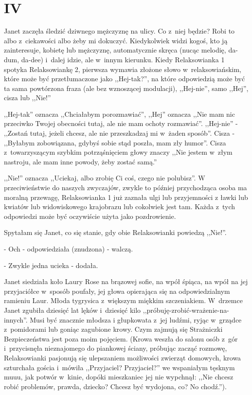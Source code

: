 \documentclass[oneside,polish,12pt,sfheadings]{mwbk}
\begin{document}
\chapter{IV}

Janet zaczęła śledzić dziwnego mężczyznę na ulicy. Co z~niej będzie?
Robi to albo z~ciekawości albo żeby mi dokuczyć. Kiedykolwiek widzi
kogoś, kto ją zainteresuje, kobietę lub mężczyznę, automatycznie skręca
(nucąc melodię, da-dum, da-dee) i~dalej idzie, ale w~innym kierunku.
Kiedy Relaksowianka 1 spotyka Relaksowiankę 2, pierwsza wymawia złożone
słowo w~relaksowiańskim, które może być przetłumaczone jako ,,Hej-tak?'',
na które odpowiedzią może być ta sama powtórzona fraza (ale bez wznoszącej
modulacji), ,,Hej-nie'', samo ,,Hej'', cisza lub ,,Nie!''

,,Hej-tak'' oznacza ,,Chciałabym porozmawiać'', ,,Hej'' oznacza ,,Nie
mam nic przeciwko Twojej obecności tutaj, ale nie mam ochoty rozmawiać''.
,,Hej-nie'' - ,,Zostań tutaj, jeżeli chcesz, ale nie przeszkadzaj
mi w~żaden sposób''. Cisza - ,,Byłabym zobowiązana, gdybyś sobie stąd
poszła, mam zły humor''. Cisza z~towarzyszącym szybkim potrząśnięciem
głowy znaczy ,,Nie jestem w~złym nastroju, ale mam inne powody, żeby
zostać samą.''

,,Nie!'' oznacza ,,Uciekaj, albo zrobię Ci coś, czego nie polubisz''.
W przeciwieństwie do naszych zwyczajów, zwykle to później przychodząca
osoba ma moralną przewagę, Relaksowianka 1 już zaznała ulgi lub przyjemności
z ławki lub kwiatów lub widowiskowego krajobrazu lub cokolwiek jest
tam. Każda z~tych odpowiedzi może być oczywiście użyta jako pozdrowienie.

Spytałam się Janet, co się stanie, gdy obie Relaksowianki powiedzą
,,Nie!''.

- Och - odpowiedziała (znudzona) - walczą.

- Zwykle jedna ucieka - dodała.

Janet siedziała koło Laury Rose na brązowej sofie, na wpół śpiąca,
na wpół na jej przyjaciółce w~sposób poufały, jej głowa opierająca
się na odpowiedzialnym ramieniu Laur. Młoda tygrysica z~większym miękkim
szczeniakiem. W~drzemce Janet zgubiła dziesięć lat lęków i~dziesięć
kilo ,,próbuję-zrobić-wrażenie-na-innych''. Musi być znacznie młodsza
i głupkowata z~jej ludźmi, ryjąc w~grządce z~pomidorami lub goniąc
zagubione krowy. Czym zajmują się Strażniczki Bezpieczeństwa jest
poza moim pojęciem. (Krowa weszła do salonu osób z~gór i~przycisnęła
nieznajomego do piankowej ściany, próbując zacząć rozmowę, Relaksowianki
pasjonują się ulepszaniem możliwości zwierząt domowych, krowa szturchała
gościa i~mówiła ,,Przyjaciel? Przyjaciel?'' we wspaniałym tęsknym
muuu, jak potwór w~kinie, dopóki mieszkaniec jej nie wypchnął: ,,Nie chcesz robić problemów, prawda, dziecko? Chcesz być wydojona, co?
No chodź.'').
\end{document}
